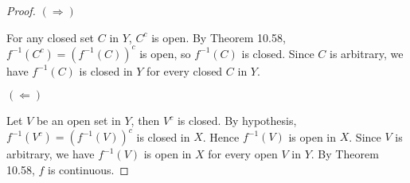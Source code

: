 \begin{Exercise}
\begin{proof}
$(\Longrightarrow)$

For any closed set $C$ in $Y$, $C^c$ is open. By Theorem 10.58, $f^{-1}(C^c) = \left( f^{-1}(C) \right)^c$ is open, so $f^{-1}(C)$ is closed. Since $C$ is arbitrary, we have $f^{-1}(C)$ is closed in $Y$ for every closed $C$ in $Y$.

\vspace{2ex}

$(\Longleftarrow)$

Let $V$ be an open set in $Y$, then $V^c$ is closed. By hypothesis, $f^{-1}(V^c) = \left(f^{-1}(V)\right)^c$ is closed in $X$. Hence $f^{-1}(V)$ is open in $X$. Since $V$ is arbitrary, we have $f^{-1}(V)$ is open in $X$ for every open $V$ in $Y$. By Theorem 10.58, $f$ is continuous.
\end{proof}
\end{Exercise}